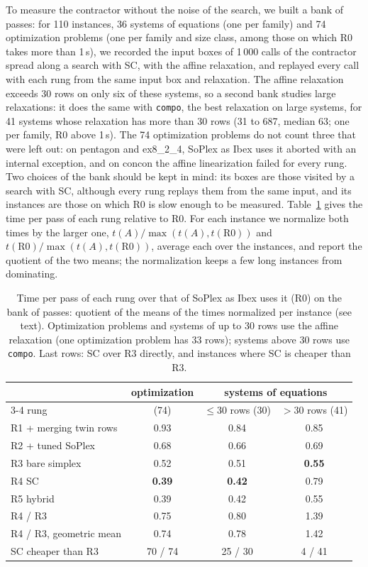 \documentclass[11pt]{article}
\theoremstyle{definition}
\theoremstyle{remark}
\begin{document}
To measure the contractor without the noise of the search, we built a bank of
passes: for 110 instances, 36 systems of equations (one per family) and 74
optimization problems (one per family and size class, among those on which R0
takes more than 1\,s), we recorded the input boxes of 1\,000 calls of the
contractor spread along a search with SC, with the affine relaxation, and
replayed every call with each rung from the same input box and relaxation.
The affine relaxation exceeds 30 rows on only six of these systems, so a
second bank studies large relaxations: it does the same with \texttt{compo},
the best relaxation on large systems, for 41 systems whose relaxation has more
than 30 rows (31 to 687, median 63; one per family, R0 above 1\,s). The 74 optimization
problems do not count three that were left out: on pentagon and ex8\_2\_4,
SoPlex as Ibex uses it aborted with an internal exception, and on concon the
affine linearization failed for every rung. Two choices of the bank should be
kept in mind: its boxes are those visited by a search with SC, although every
rung replays them from the same input, and its instances are those on which
R0 is slow enough to be measured.
Table~\ref{tab:ladder} gives the time per pass of each rung relative to R0.
For each instance we normalize both times by the larger one,
$t(A)/\max(t(A),t(\mathrm{R0}))$ and $t(\mathrm{R0})/\max(t(A),t(\mathrm{R0}))$,
average each over the instances, and report the quotient of the two means;
the normalization keeps a few long instances from dominating.

\begin{table}[t]
\centering
\caption{Time per pass of each rung over that of SoPlex as Ibex uses it (R0)
on the bank of passes: quotient of the means of the times normalized per
instance (see text). Optimization problems and systems of up to 30 rows use
the affine relaxation (one optimization problem has 33 rows); systems above
30 rows use \texttt{compo}. Last rows: SC over R3 directly, and instances
where SC is cheaper than R3.}
\label{tab:ladder}
\begin{tabular}{lccc}
\toprule
& optimization & \multicolumn{2}{c}{systems of equations}\\
\cmidrule(lr){3-4}
rung & (74) & $\le 30$ rows (30) & $>30$ rows (41)\\
\midrule
R1 + merging twin rows & 0.93 & 0.84 & 0.85\\
R2 + tuned SoPlex      & 0.68 & 0.66 & 0.69\\
R3 bare simplex        & 0.52 & 0.51 & \textbf{0.55}\\
R4 SC                  & \textbf{0.39} & \textbf{0.42} & 0.79\\
R5 hybrid              & 0.39 & 0.42 & 0.55\\
\midrule
R4 / R3                & 0.75 & 0.80 & 1.39\\
R4 / R3, geometric mean & 0.74 & 0.78 & 1.42\\
SC cheaper than R3     & 70 / 74 & 25 / 30 & 4 / 41\\
\bottomrule
\end{tabular}
\end{table}
\end{document}
